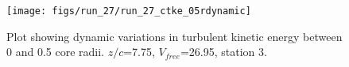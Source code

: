 \begin{figure}[H]
\centering
\texttt{[image: figs/run\_27/run\_27\_ctke\_05rdynamic]}
\caption{Plot showing dynamic variations in turbulent kinetic energy between 0 and 0.5 core radii. $z/c$=7.75, $V_{free}$=26.95, station 3.}
\label{fig:run_27_ctke_05rdynamic}
\end{figure}


